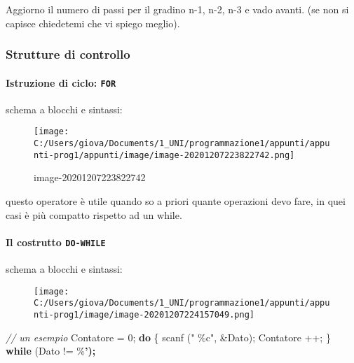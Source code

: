 \documentclass[
]{article}
\newenvironment{Shaded}{}{}
\newcommand{\CharTok}[1]{\textcolor[rgb]{0.25,0.44,0.63}{#1}}
\newcommand{\CommentTok}[1]{\textcolor[rgb]{0.38,0.63,0.69}{\textit{#1}}}
\newcommand{\ControlFlowTok}[1]{\textcolor[rgb]{0.00,0.44,0.13}{\textbf{#1}}}
\newcommand{\DecValTok}[1]{\textcolor[rgb]{0.25,0.63,0.44}{#1}}
\newcommand{\ErrorTok}[1]{\textcolor[rgb]{1.00,0.00,0.00}{\textbf{#1}}}
\newcommand{\NormalTok}[1]{#1}
\newcommand{\SpecialCharTok}[1]{\textcolor[rgb]{0.25,0.44,0.63}{#1}}
\newcommand{\StringTok}[1]{\textcolor[rgb]{0.25,0.44,0.63}{#1}}
\begin{document}
Aggiorno il numero di passi per il gradino n-1, n-2, n-3 e vado avanti.
(se non si capisce chiedetemi che vi spiego meglio).

\hypertarget{header-n407}{%
\subsubsection{Strutture di controllo}\label{header-n407}}

\hypertarget{header-n408}{%
\paragraph{\texorpdfstring{Istruzione di ciclo:
\texttt{FOR}}{Istruzione di ciclo: FOR}}\label{header-n408}}

schema a blocchi e sintassi:

\begin{figure}
\centering
\texttt{[image: C:/Users/giova/Documents/1\_UNI/programmazione1/appunti/appunti-prog1/appunti/image/image-20201207223822742.png]}
\caption{image-20201207223822742}
\end{figure}

questo operatore è utile quando so a priori quante operazioni devo fare,
in quei casi è più compatto rispetto ad un while.

\hypertarget{header-n413}{%
\paragraph{\texorpdfstring{Il costrutto
\texttt{DO-WHILE}}{Il costrutto DO-WHILE}}\label{header-n413}}

schema a blocchi e sintassi:

\begin{figure}
\centering
\texttt{[image: C:/Users/giova/Documents/1\_UNI/programmazione1/appunti/appunti-prog1/image/image-20201207224157049.png]}
\caption{}
\end{figure}

\begin{Shaded}
\begin{Highlighting}[]
\CommentTok{// un esempio}
\NormalTok{Contatore = }\DecValTok{0}\NormalTok{;}
\ControlFlowTok{do}
\NormalTok{\{}
\NormalTok{    scanf (}\StringTok{" }\SpecialCharTok{\%c}\StringTok{"}\NormalTok{, \&Dato);}
\NormalTok{    Contatore ++;}
\NormalTok{\} }\ControlFlowTok{while}\NormalTok{ (Dato != }\CharTok{\textquotesingle{}\%}\ErrorTok{’);}
\end{Highlighting}
\end{Shaded}
\end{document}
